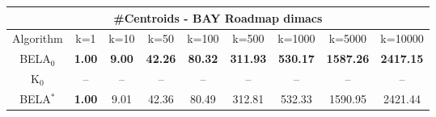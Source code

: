 \begin{tabular}{c|cccccccc}\toprule
\multicolumn{9}{c}{#Centroids - BAY Roadmap dimacs}\\ \midrule
Algorithm & k=1 & k=10 & k=50 & k=100 & k=500 & k=1000 & k=5000 & k=10000 \\ \midrule
BELA$_0$ & \textbf{1.00} & \textbf{9.00} & \textbf{42.26} & \textbf{80.32} & \textbf{311.93} & \textbf{530.17} & \textbf{1587.26} & \textbf{2417.15} \\
K$_0$ & -- & -- & -- & -- & -- & -- & -- & -- \\
BELA$^*$ & \textbf{1.00} & 9.01 & 42.36 & 80.49 & 312.81 & 532.33 & 1590.95 & 2421.44 \\ \bottomrule 
\end{tabular}
